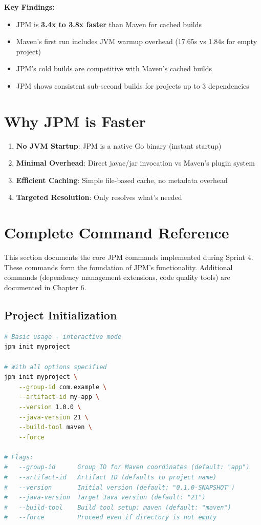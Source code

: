 \documentclass[12pt,a4paper]{report}
\begin{document}
\textbf{Key Findings:}
\begin{itemize}
    \item JPM is \textbf{3.4x to 3.8x faster} than Maven for cached builds
    \item Maven's first run includes JVM warmup overhead (17.65s vs 1.84s for empty project)
    \item JPM's cold builds are competitive with Maven's cached builds
    \item JPM shows consistent sub-second builds for projects up to 3 dependencies
\end{itemize}

\section{Why JPM is Faster}

\begin{enumerate}
    \item \textbf{No JVM Startup}: JPM is a native Go binary (instant startup)
    \item \textbf{Minimal Overhead}: Direct javac/jar invocation vs Maven's plugin system
    \item \textbf{Efficient Caching}: Simple file-based cache, no metadata overhead
    \item \textbf{Targeted Resolution}: Only resolves what's needed
\end{enumerate}

\section{Complete Command Reference}

This section documents the core JPM commands implemented during Sprint 4. These commands form the foundation of JPM's functionality. Additional commands (dependency management extensions, code quality tools) are documented in Chapter 6.

\subsection{Project Initialization}

\begin{lstlisting}[language=bash, caption=jpm init - Initialize a new Java project]
# Basic usage - interactive mode
jpm init myproject

# With all options specified
jpm init myproject \
    --group-id com.example \
    --artifact-id my-app \
    --version 1.0.0 \
    --java-version 21 \
    --build-tool maven \
    --force

# Flags:
#   --group-id      Group ID for Maven coordinates (default: "app")
#   --artifact-id   Artifact ID (defaults to project name)
#   --version       Initial version (default: "0.1.0-SNAPSHOT")
#   --java-version  Target Java version (default: "21")
#   --build-tool    Build tool setup: maven (default: "maven")
#   --force         Proceed even if directory is not empty
\end{lstlisting}
\end{document}
